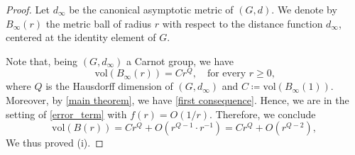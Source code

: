 \documentclass[a4paper,11pt,reqno]{amsart}
\theoremstyle{plain}
\theoremstyle{definition}
\newcommand{\vol}{\mathrm{vol}}
\newcommand{\coloneq}{\coloneqq}
\begin{document}
 \begin{proof}
 Let $d_\infty$ be the canonical asymptotic metric of $(G,d)$. 
 We denote by $B_\infty(r)$ the metric ball of radius $r$ with respect to the distance function $d_\infty$, centered at the identity element of $G$. 

Note that, being $(G,d_\infty)$ a Carnot group,
 we have 
 \begin{equation} \label{volume_spheres}
     \vol(B_{\infty}(r))=Cr^Q, \quad \text{for every $r \ge 0$,}
 \end{equation}
 where $Q$ is the Hausdorff dimension of $(G,d_\infty)$ and $C \coloneq \vol\left(B_{\infty}(1)\right)$.
 Moreover, by \cref{main theorem}, we have \eqref{first consequence}. 
 Hence, we are in the setting of \cref{error_term} with $f(r)= O(1/r)$. 
 Therefore, we conclude 
 \begin{equation*}
 \vol(B(r)) = Cr^Q + O(r^{Q-1}\cdot r^{-1}) = Cr^Q + O(r^{Q-2}),
 \end{equation*}
 We thus proved (i).
 



\end{proof}
\end{document}
